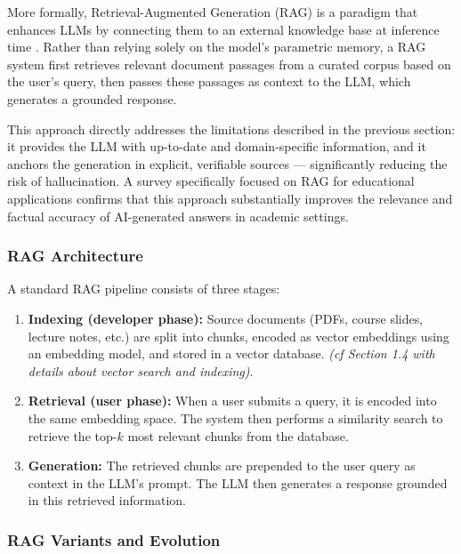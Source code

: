 \documentclass[a4paper,11pt]{article}
\begin{document}
More formally, Retrieval-Augmented Generation (RAG) is a paradigm that
enhances LLMs by connecting them to an external knowledge base at inference
time \cite{lewis2020rag}. Rather than relying solely on the model's
parametric memory, a RAG system first retrieves relevant document passages
from a curated corpus based on the user's query, then passes these passages
as context to the LLM, which generates a grounded response. 

This approach directly addresses the limitations described in the previous
section: it provides the LLM with up-to-date and domain-specific
information, and it anchors the generation in explicit, verifiable sources
--- significantly reducing the risk of hallucination. A survey specifically
focused on RAG for educational applications \cite{rag_education_survey}
confirms that this approach substantially improves the relevance and factual
accuracy of AI-generated answers in academic settings.

\newpage
\subsubsection{RAG Architecture}
 
A standard RAG pipeline consists of three stages: 
 
\begin{enumerate}
  \item \textbf{Indexing (developer phase):} Source documents (PDFs, course
    slides, lecture notes, etc.) are split into chunks, encoded as vector
    embeddings using an embedding model, and stored in a vector database.
    \emph{(cf Section 1.4 with details about vector search and indexing)}.

  \item \textbf{Retrieval (user phase):} When a user submits a query, it is
    encoded into the same embedding space. The system then performs a
    similarity search to retrieve the top-$k$ most relevant chunks from the
    database.
 
  \item \textbf{Generation:} The retrieved chunks are prepended to the user
    query as context in the LLM's prompt. The LLM then generates a response
    grounded in this retrieved information.
\end{enumerate}

\subsubsection{RAG Variants and Evolution}
 
\end{document}
